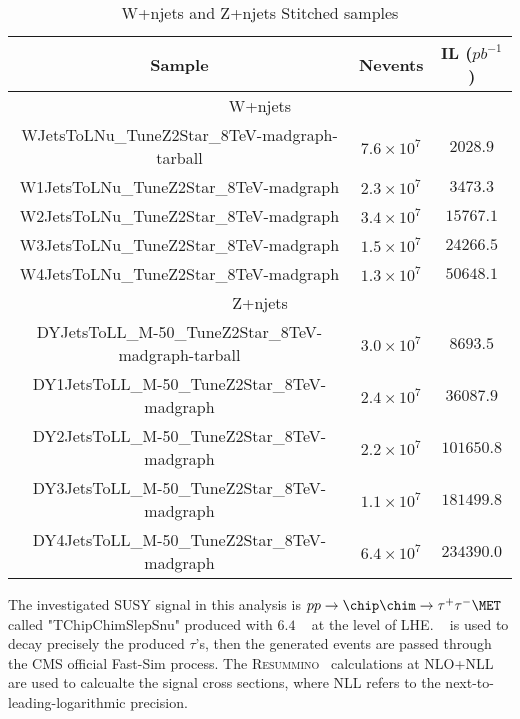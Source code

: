 \begin{table}[!h]
\begin{center}
\begin{tabular}{|c|c|c|}
\hline\hline
Sample    & Nevents  & IL ($pb^{-1}$) \\ \hline
\multicolumn{3}{|c|}{W+njets} \\\hline
WJetsToLNu\_TuneZ2Star\_8TeV-madgraph-tarball     & $7.6\times 10^{7}$ & $2028.9$  \\ \hline
W1JetsToLNu\_TuneZ2Star\_8TeV-madgraph            & $2.3\times 10^{7}$ & $3473.3$  \\ \hline
W2JetsToLNu\_TuneZ2Star\_8TeV-madgraph            & $3.4\times 10^{7}$ & $15767.1$ \\ \hline
W3JetsToLNu\_TuneZ2Star\_8TeV-madgraph            & $1.5\times 10^{7}$ & $24266.5$ \\ \hline
W4JetsToLNu\_TuneZ2Star\_8TeV-madgraph            & $1.3\times 10^{7}$ & $50648.1$ \\ \hline
\multicolumn{3}{|c|}{Z+njets} \\\hline
DYJetsToLL\_M-50\_TuneZ2Star\_8TeV-madgraph-tarball & $3.0\times 10^{7}$ & $8693.5$ \\ \hline
DY1JetsToLL\_M-50\_TuneZ2Star\_8TeV-madgraph        & $2.4\times 10^{7}$ & $36087.9$\\ \hline
DY2JetsToLL\_M-50\_TuneZ2Star\_8TeV-madgraph        & $2.2\times 10^{7}$ & $101650.8$\\ \hline
DY3JetsToLL\_M-50\_TuneZ2Star\_8TeV-madgraph        & $1.1\times 10^{7}$ & $181499.8$\\ \hline
DY4JetsToLL\_M-50\_TuneZ2Star\_8TeV-madgraph        & $6.4\times 10^{7}$ & $234390.0$\\ \hline
\hline
\end{tabular}
\end{center}
\caption{W+njets and Z+njets Stitched samples}
\label{Tab.Stitching}
\end{table}


The investigated SUSY signal in this analysis is {\small $pp \rightarrow \chip \chim \rightarrow \tau^+ \tau^- \MET$} called {\small "TChipChimSlepSnu"} produced with \PYTHIA $6.4$ ~\cite{PYTHIA} at the level of LHE. \TAUOLA ~\cite{TAUOLA} is used to decay precisely the produced $\tau$'s, then the generated events are passed through the CMS official Fast-Sim process.
The \textsc{Resummino}~\cite{Fuks:2012qx,Fuks:2013vua,Fuks:2013lya} calculations at NLO+NLL are used to calcualte the signal cross sections, where 
NLL refers to the next-to-leading-logarithmic precision.

